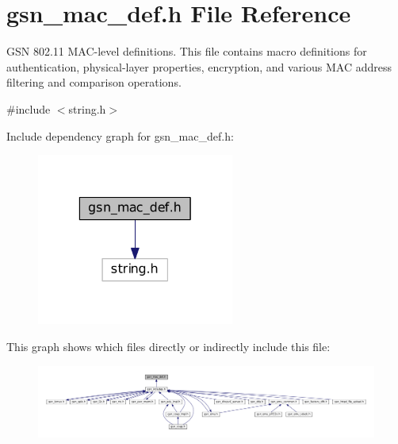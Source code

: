 \hypertarget{a00522}{
\section{gsn\_\-mac\_\-def.h File Reference}
\label{a00522}
}


GSN 802.11 MAC-\/level definitions. This file contains macro definitions for authentication, physical-\/layer properties, encryption, and various MAC address filtering and comparison operations.  


{\ttfamily \#include $<$string.h$>$}\par
Include dependency graph for gsn\_\-mac\_\-def.h:
\nopagebreak
\begin{figure}[H]
\begin{center}
\leavevmode
\includegraphics[width=184pt]{a00756}
\end{center}
\end{figure}
This graph shows which files directly or indirectly include this file:
\nopagebreak
\begin{figure}[H]
\begin{center}
\leavevmode
\includegraphics[width=400pt]{a00757}
\end{center}
\end{figure}
